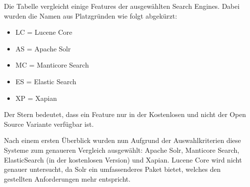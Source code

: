 \begin{table}
    Die Tabelle vergleicht einige Features der ausgewählten Search Engines. Dabei wurden die Namen aus Platzgründen wie folgt abgekürzt:

    \begin{itemize}
        \item LC = Lucene Core
        \item AS = Apache Solr
        \item MC = Manticore Search
        \item ES = Elastic Search
        \item XP = Xapian
    \end{itemize} 

    Der Stern bedeutet, dass ein Feature nur in der Kostenlosen und nicht der Open Source Variante verfügbar ist.

\end{table}


Nach einem ersten Überblick wurden nun Aufgrund der Auswahlkriterien diese Systeme zum genaueren Vergleich ausgewählt: Apache Solr, Manticore Search, ElasticSearch (in der kostenlosen Version) und Xapian. Lucene Core wird nicht genauer untersucht, da Solr ein umfassenderes Paket bietet, welches den gestellten Anforderungen mehr entspricht.